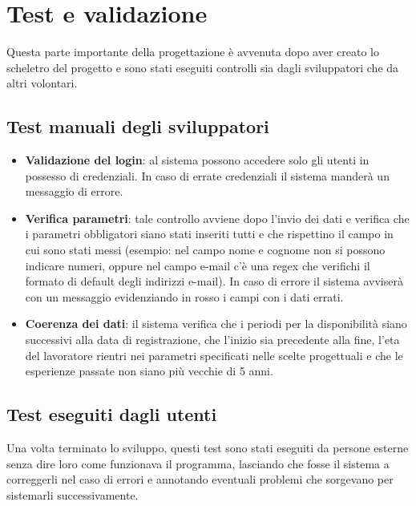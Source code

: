 \documentclass{article}
\begin{document}
    \section{Test e validazione}

    Questa parte importante della progettazione è avvenuta dopo aver creato lo scheletro del progetto e sono stati eseguiti controlli sia dagli sviluppatori che da altri volontari.

    \subsection{Test manuali degli sviluppatori}

    \begin{itemize}
        \item[] \textbf{Validazione del login}: al sistema possono accedere solo gli utenti in possesso di credenziali. In caso di errate credenziali il sistema manderà un messaggio di errore.
        \item[] \textbf{Verifica parametri}: tale controllo avviene dopo l'invio dei dati e verifica che i parametri obbligatori siano stati inseriti tutti e che rispettino il campo in cui sono stati messi (esempio: nel campo nome e cognome non si possono indicare numeri, oppure nel campo e-mail c'è una regex che verifichi il formato di default degli indirizzi e-mail). In caso di errore il sistema avviserà con un messaggio evidenziando in rosso i campi con i dati errati.
        \item[] \textbf{Coerenza dei dati}: il sistema verifica che i periodi per la disponibilità siano successivi alla data di registrazione, che l'inizio sia precedente alla fine, l'eta del lavoratore rientri nei parametri specificati nelle scelte progettuali e che le esperienze passate non siano più vecchie di 5 anni.
    \end{itemize}

    \subsection{Test eseguiti dagli utenti}

     Una volta terminato lo sviluppo, questi test sono stati eseguiti da persone esterne senza dire loro come funzionava il programma, lasciando che fosse il sistema a correggerli nel caso di errori e annotando eventuali problemi che sorgevano per sistemarli successivamente.
    
\end{document}
